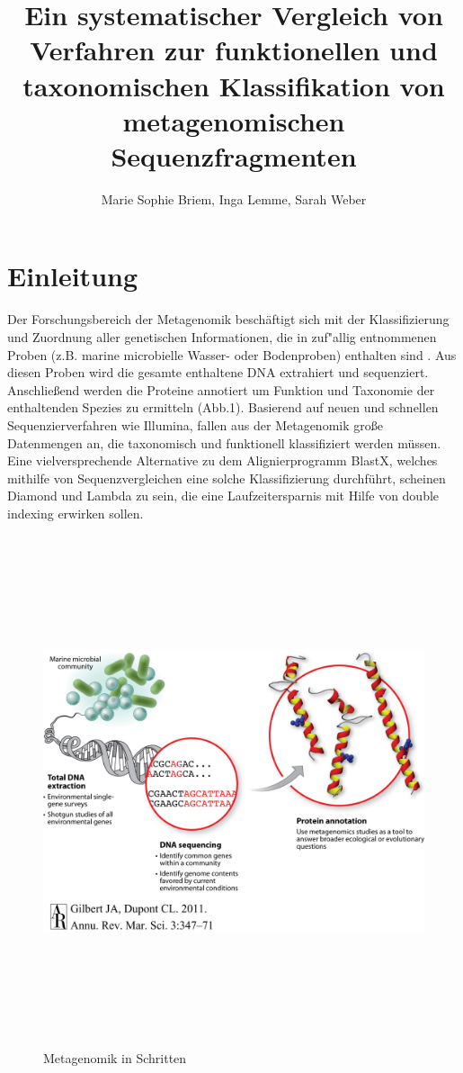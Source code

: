 \documentclass[10pt, a4paper]{article}[08.12.2015]
\begin{document}
  \title{Ein systematischer Vergleich von Verfahren zur funktionellen und
		taxonomischen Klassifikation von metagenomischen Sequenzfragmenten}
  \author{Marie Sophie Briem, Inga Lemme, Sarah Weber}
  \maketitle
  \thispagestyle{empty}
  \newpage
  \setcounter{page}{2}
  \newpage
  \tableofcontents
  \newpage
  \listoffigures
  \newpage
   \section{Einleitung}
    Der Forschungsbereich der Metagenomik besch\"aftigt sich mit der Klassifizierung und Zuordnung aller genetischen Informationen, die in zuf"allig entnommenen Proben (z.B. marine microbielle Wasser- oder Bodenproben) enthalten sind \cite{handelsman1998}. Aus diesen Proben wird die gesamte enthaltene DNA extrahiert und sequenziert. Anschlie{\ss}end werden die Proteine annotiert um Funktion und Taxonomie der enthaltenden Spezies zu ermitteln (Abb.1).
    Basierend auf neuen und schnellen Sequenzierverfahren wie Illumina, fallen aus der Metagenomik gro{\ss}e Datenmengen an, die taxonomisch und funktionell klassifiziert werden m\"ussen. Eine vielversprechende Alternative zu dem Alignierprogramm BlastX, welches mithilfe von Sequenzvergleichen eine solche Klassifizierung durchf\"uhrt, scheinen Diamond \cite{buchfink2014} und Lambda \cite{hauswedell2014} zu sein, die eine Laufzeitersparnis mit Hilfe von double indexing erwirken sollen. 
    \newline
    \begin{figure}[h]
\centering
      \noindent\includegraphics[width=\linewidth,height=15cm,
      keepaspectratio]{Abbildungen/metagenome-steps.jpg}
      \caption{Metagenomik in Schritten}
\end{figure}
\end{document}
